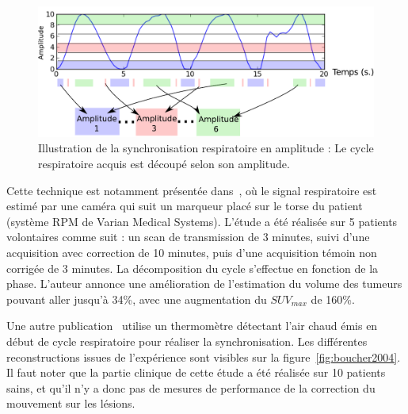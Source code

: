 \begin{figure}[h!]
	\begin{center}
		\includegraphics[width=14cm]{images/gatingAmplitude}
	\end{center}
	\caption{Illustration de la synchronisation respiratoire en amplitude : Le cycle respiratoire acquis est découpé selon son amplitude.} 
	\label{fig:gatingRespiAmplitude}
\end{figure}


Cette technique est notamment présentée dans~\cite{nehmeh2002effect}, où le signal respiratoire est estimé par une caméra qui suit un marqueur placé sur le torse du patient (système RPM de Varian Medical Systems). L'étude a été réalisée sur 5 patients volontaires comme suit : un scan de transmission de 3 minutes, suivi d'une acquisition avec correction de 10 minutes, puis d'une acquisition témoin non corrigée de 3 minutes. La décomposition du cycle s'effectue en fonction de la phase. L'auteur annonce une amélioration de l'estimation du volume des tumeurs pouvant aller jusqu'à 34\%, avec une augmentation du $SUV_{max}$ de 160\%. 

Une autre publication~\cite{boucher2004respiratory} utilise un thermomètre détectant l'air chaud émis en début de cycle respiratoire pour réaliser la synchronisation. Les différentes reconstructions issues de l'expérience sont visibles sur la figure~\ref{fig:boucher2004}. Il faut noter que la partie clinique de cette étude a été réalisée sur 10 patients sains, et qu'il n'y a donc pas de mesures de performance de la correction du mouvement sur les lésions. 

